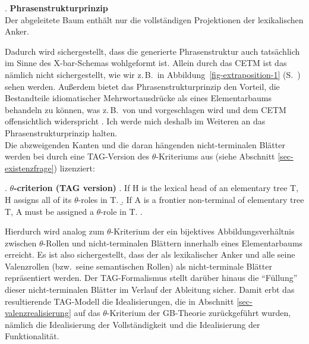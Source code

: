 \ex. {\bf Phrasenstrukturprinzip} \label{ex-psprinzip-1}\\
Der abgeleitete Baum enthält nur die vollständigen Projektionen der lexikalischen Anker.

Dadurch wird sichergestellt, dass die generierte Phrasenstruktur auch tatsächlich im Sinne des X-bar-Schemas wohlgeformt ist. Allein durch das CETM ist das nämlich nicht sichergestellt, wie wir z.\,B.\ in Abbildung~\ref{fig-extraposition-1} (S.~\pageref{fig-extraposition-1}) sehen werden. Außerdem bietet das Phrasenstrukturprinzip den Vorteil, die Bestandteile idiomatischer Mehrwortausdrücke als  eines Elementarbaums behandeln zu können, was z.\,B.\ von \cite{Abeille:Schabes:89,Abeille:Schabes:96} und \cite{Abeille:95} vorgeschlagen wird und dem CETM offensichtlich widerspricht \citep[Endnote~5, 292]{Frank:02}. Ich werde mich deshalb im Weiteren an das Phrasenstrukturprinzip halten.\\

Die abzweigenden Kanten und die daran hängenden nicht-terminalen Blätter werden bei \cite{Frank:02} durch eine TAG-Version des $\theta$-Kriteriums aus \cite{Chomsky:81} (siehe Abschnitt \ref{sec-existenzfrage}) lizenziert:

\ex. {\bf $\theta$-criterion (TAG version)} \label{ex-theta-criterion}
\a. If H is the lexical head of an elementary tree T, H assigns all of its $\theta$-roles in T.
\b. If A is a frontier non-terminal of elementary tree T, A must be assigned a $\theta$-role in T.
\z.
\citep[55]{Frank:02} 

Hierdurch wird analog zum $\theta$-Kriterium der  ein bijektives Abbildungsverhältnis zwischen $\theta$-Rollen und nicht-terminalen Blättern innerhalb eines Elementarbaums erreicht. Es ist also sichergestellt, dass der  als lexikalischer Anker und alle seine Valenzrollen (bzw.\ seine semantischen Rollen) als nicht-terminale Blätter repräsentiert werden. Der TAG-Formalismus stellt darüber hinaus die "`Füllung"' dieser nicht-terminalen Blätter im Verlauf der Ableitung sicher. Damit erbt das resultierende TAG-Modell die Idealisierungen, die in Abschnitt \ref{sec-valenzrealisierung} auf das $\theta$-Kriterium der GB-Theorie zurückgeführt wurden, nämlich die Idealisierung der Vollständigkeit und die Idealisierung der Funktionalität.

